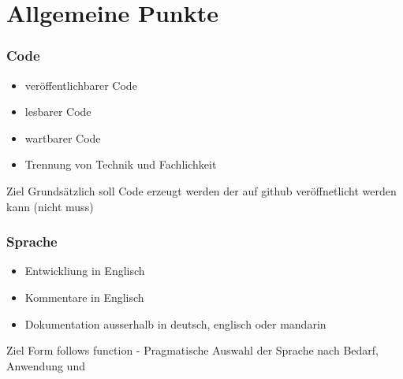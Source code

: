 \section{Allgemeine Punkte} 
\begin{frame}
\frametitle{Code} 
\begin{itemize}
\item veröffentlichbarer Code
\item lesbarer Code
\item wartbarer Code
\item Trennung von Technik und Fachlichkeit
\end{itemize}
\begin{block}{Ziel}
  Grundsätzlich soll Code erzeugt werden der auf github veröffnetlicht werden kann (nicht muss)
  \end{block}
\end{frame}
\begin{frame}
\frametitle{Sprache} 
\begin{itemize}
\item Entwickliung in Englisch
\item Kommentare in Englisch
\item Dokumentation ausserhalb in deutsch, englisch oder mandarin
\end{itemize}
\begin{block}{Ziel}
  Form follows function - Pragmatische Auswahl der Sprache nach Bedarf, Anwendung und
  \end{block}
\end{frame}